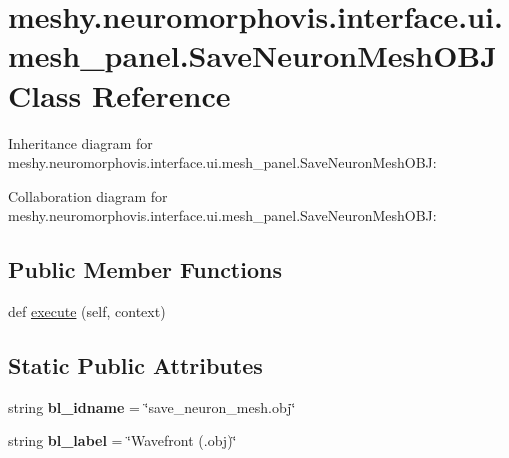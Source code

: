 \hypertarget{classmeshy_1_1neuromorphovis_1_1interface_1_1ui_1_1mesh__panel_1_1SaveNeuronMeshOBJ}{}\section{meshy.\+neuromorphovis.\+interface.\+ui.\+mesh\+\_\+panel.\+Save\+Neuron\+Mesh\+O\+BJ Class Reference}
\label{classmeshy_1_1neuromorphovis_1_1interface_1_1ui_1_1mesh__panel_1_1SaveNeuronMeshOBJ}


Inheritance diagram for meshy.\+neuromorphovis.\+interface.\+ui.\+mesh\+\_\+panel.\+Save\+Neuron\+Mesh\+O\+BJ\+:


Collaboration diagram for meshy.\+neuromorphovis.\+interface.\+ui.\+mesh\+\_\+panel.\+Save\+Neuron\+Mesh\+O\+BJ\+:
\subsection*{Public Member Functions}
\begin{DoxyCompactItemize}
\item 
def \hyperlink{classmeshy_1_1neuromorphovis_1_1interface_1_1ui_1_1mesh__panel_1_1SaveNeuronMeshOBJ_a0671f3689ba0d2ad4d965cdea00190cd}{execute} (self, context)
\end{DoxyCompactItemize}
\subsection*{Static Public Attributes}
\begin{DoxyCompactItemize}
\item 
string {\bfseries bl\+\_\+idname} = \char`\"{}save\+\_\+neuron\+\_\+mesh.\+obj\char`\"{}\hypertarget{classmeshy_1_1neuromorphovis_1_1interface_1_1ui_1_1mesh__panel_1_1SaveNeuronMeshOBJ_a9a0c7f019c115b5eef15f21a67913873}{}\label{classmeshy_1_1neuromorphovis_1_1interface_1_1ui_1_1mesh__panel_1_1SaveNeuronMeshOBJ_a9a0c7f019c115b5eef15f21a67913873}

\item 
string {\bfseries bl\+\_\+label} = \char`\"{}Wavefront (.obj)\char`\"{}\hypertarget{classmeshy_1_1neuromorphovis_1_1interface_1_1ui_1_1mesh__panel_1_1SaveNeuronMeshOBJ_a02435b913e287e83fea1f01163ac5c45}{}\label{classmeshy_1_1neuromorphovis_1_1interface_1_1ui_1_1mesh__panel_1_1SaveNeuronMeshOBJ_a02435b913e287e83fea1f01163ac5c45}

\end{DoxyCompactItemize}


